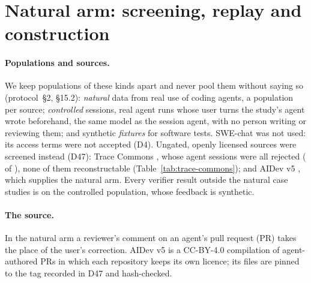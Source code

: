 \section{Natural arm: screening, replay and construction}
\label{app:natural}\label{sec:natural}\label{sec:results-natural}

\paragraph{Populations and sources.} We keep populations of these kinds apart and never pool them without saying so
(protocol~\S2, \S15.2): \emph{natural} data from real use of coding agents, a population per source; \emph{controlled}
sessions, real agent runs whose user turns the study's agent wrote beforehand, the same model as the session agent, with
no person writing or reviewing them; and synthetic \emph{fixtures} for software tests. SWE-chat \cite{swechat} was not
used: its access terms were not accepted (D4). Ungated, openly licensed sources were screened instead (D47): Trace
Commons \cite{tracecommons2026trace}, whose agent sessions were all rejected ( of ),
none of them reconstructable (Table~\ref{tab:trace-commons}); and AIDev v5 \cite{li2025rise,li2026aidev,haoli2025aidev}, which
supplies the natural arm. Every verifier result outside the natural case studies is on the controlled population, whose
feedback is synthetic.

\paragraph{The source.} In the natural arm a reviewer's comment on an agent's pull request (PR) takes the place of the
user's correction. AIDev v5 is a CC-BY-4.0 compilation of agent-authored PRs in which each repository keeps its own
licence; its files are pinned to the tag recorded in D47 and hash-checked.

